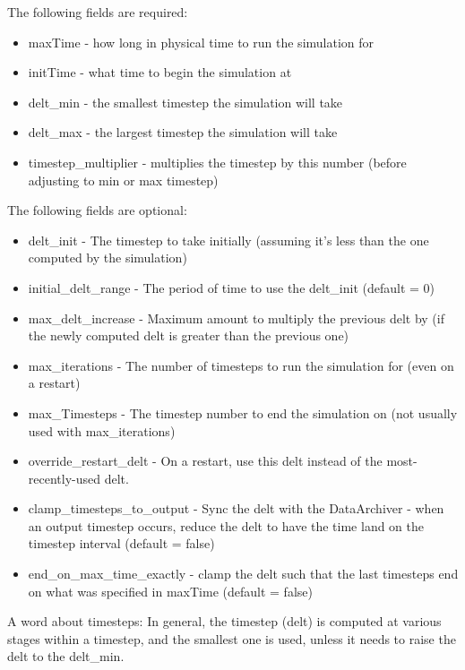 The following fields are required:

\begin{itemize}
\item maxTime - how long in physical time to run the simulation for
\item initTime - what time to begin the simulation at
\item delt\_min - the smallest timestep the simulation will take
\item delt\_max - the largest timestep the simulation will take
\item timestep\_multiplier - multiplies the timestep by this number (before adjusting to min or max timestep)
\end{itemize}

The following fields are optional:

\begin{itemize}
\item delt\_init - The timestep to take initially (assuming it's less than the one computed by the simulation)
\item initial\_delt\_range - The period of time to use the delt\_init (default = 0)
\item max\_delt\_increase - Maximum amount to multiply the previous delt by (if the newly computed delt is greater than the previous one)
\item max\_iterations - The number of timesteps to run the simulation for (even on a restart)
\item max\_Timesteps - The timestep number to end the simulation on (not usually used with max\_iterations)
\item override\_restart\_delt - On a restart, use this delt instead of the most-recently-used delt.
\item clamp\_timesteps\_to\_output - Sync the delt with the DataArchiver - when an output timestep occurs, reduce the delt to have the time land on the timestep interval (default = false)
\item end\_on\_max\_time\_exactly - clamp the delt such that the last timesteps end on what was specified in maxTime (default = false)
\end{itemize}

A word about timesteps: In general, the timestep (delt) is computed at various stages within a timestep, and the smallest one is used, unless it needs to raise the delt to the delt\_min.




%
